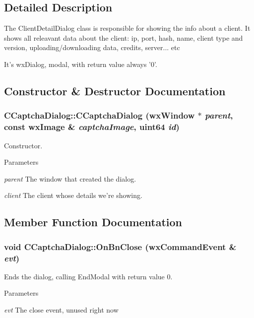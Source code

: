 \subsection{Detailed Description}
The ClientDetailDialog class is responsible for showing the info about a client. It shows all releavant data about the client: ip, port, hash, name, client type and version, uploading/downloading data, credits, server... etc

It's wxDialog, modal, with return value always '0'. 

\subsection{Constructor \& Destructor Documentation}
\subsubsection[{CCaptchaDialog}]{\setlength{\rightskip}{0pt plus 5cm}CCaptchaDialog::CCaptchaDialog (wxWindow $\ast$ {\em parent}, \/  const wxImage \& {\em captchaImage}, \/  uint64 {\em id})}\label{classCCaptchaDialog_a9b357cb6f9c2e2429df883fe039af12e}


Constructor. 
\begin{DoxyParams}{Parameters}
\item[{\em parent}]The window that created the dialog. \item[{\em client}]The client whose details we're showing. \end{DoxyParams}


\subsection{Member Function Documentation}
\subsubsection[{OnBnClose}]{\setlength{\rightskip}{0pt plus 5cm}void CCaptchaDialog::OnBnClose (wxCommandEvent \& {\em evt})\hspace{0.3cm}{\ttfamily  [protected]}}\label{classCCaptchaDialog_ae6a7b5c6d2c470e87ef0cc134de6093f}


Ends the dialog, calling EndModal with return value 0. 
\begin{DoxyParams}{Parameters}
\item[{\em evt}]The close event, unused right now \end{DoxyParams}
